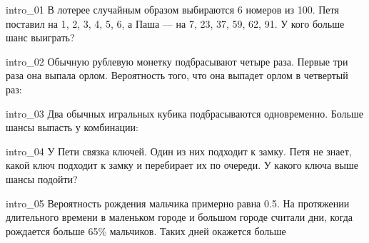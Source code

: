\documentclass{article}
\begin{document}


\begin{question}{intro_01}
В лотерее случайным образом выбираются 6 номеров из 100. Петя поставил на 1, 2, 3, 4, 5, 6, а Паша — на 7, 23, 37, 59, 62, 91. У кого больше шанс выиграть?
  \begin{choiceshoriz}
  \end{choiceshoriz}
\end{question}


\begin{question}{intro_02}
Обычную рублевую монетку подбрасывают четыре раза. Первые три раза она выпала орлом. Вероятность того, что она выпадет орлом в четвертый раз:
  \begin{choiceshoriz}
  \end{choiceshoriz}
\end{question}


\begin{question}{intro_03}
Два обычных игральных кубика подбрасываются одновременно. Больше шансы выпасть у комбинации:
  \begin{choiceshoriz}[o]
  \end{choiceshoriz}
\end{question}


\begin{question}{intro_04}
У Пети связка ключей. Один из них подходит к замку. Петя не знает, какой ключ подходит к замку и перебирает их по очереди. У какого ключа выше шансы подойти?
  \begin{choiceshoriz}[o]
  \end{choiceshoriz}
\end{question}

\begin{question}{intro_05}
Вероятность рождения мальчика примерно равна 0.5. На протяжении длительного времени в маленьком городе и большом городе считали дни, когда рождается больше 65\% мальчиков. Таких дней окажется больше
  \begin{choiceshoriz}
  \end{choiceshoriz}
\end{question}
\end{document}
